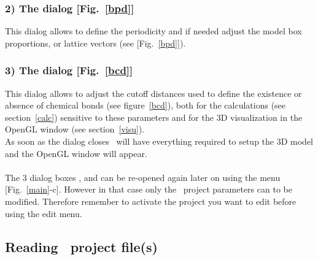 \subsubsection*{2) The  dialog [Fig.~\ref{bpd}]}
\bpdfig
This dialog allows to define the periodicity and if needed adjust the model box proportions, or lattice vectors (see [Fig.~\ref{bpd}]). 
\subsubsection*{3) The  dialog [Fig.~\ref{bcd}]}
This dialog allows to adjust the cutoff distances used to define the existence or absence of chemical bonds (see figure~\ref{bcd}), 
both for the calculations (see section~\ref{calc}) sensitive to these parameters and for the 3D visualization in the OpenGL window (see section~\ref{visu}). \\ 
As soon as the  dialog closes \atomes\ will have everything required to setup the 3D model and the OpenGL window will appear. \\
\\
The 3 dialog boxes ,  and  can be re-opened again later on using the  menu [Fig.~\ref{main}-c]. 
However in that case only the \activp\ project parameters can to be modified. Therefore remember to activate the project you want to edit before using the edit menu.
\clearpage

\subsection{Reading \atomes\ project file(s)}
\label{apf}

